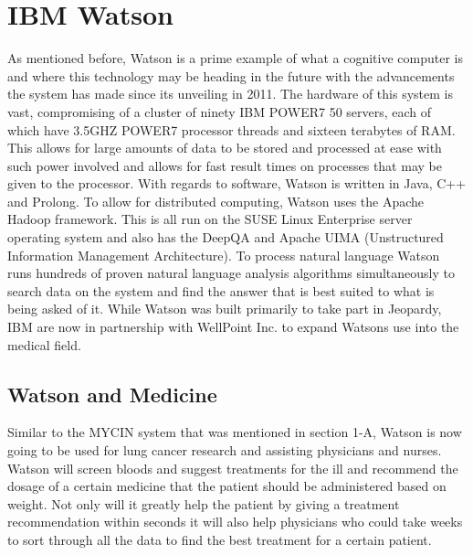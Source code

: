 \documentclass[journal]{IEEEtran}
\begin{document}
\section{IBM Watson}
As mentioned before, Watson is a prime example of what a cognitive computer is and where this technology may be heading in the future with the advancements the system has made since its unveiling in 2011. The hardware of this system is vast, compromising of a cluster of ninety IBM POWER7 50 servers, each of which have 3.5GHZ POWER7 processor threads and sixteen terabytes of RAM\cite{power}. This allows for large amounts of data to be stored and processed at ease with such power involved and allows for fast result times on processes that may be given to the processor. With regards to software, Watson is written in Java, C++ and Prolong. To allow for distributed computing, Watson uses the Apache Hadoop framework\cite{hadoop}. This is all run on the SUSE Linux Enterprise server operating system and also has the DeepQA and Apache UIMA (Unstructured Information Management Architecture). To process natural language Watson runs hundreds of proven natural language analysis algorithms simultaneously to search data on the system and find the answer that is best suited to what is being asked of it. While Watson was built primarily to take part in Jeopardy, IBM are now in partnership with WellPoint Inc. to expand Watsons use into the medical field.

\subsection{Watson and Medicine}
Similar to the MYCIN system that was mentioned in section 1-A, Watson is now going to be used for lung cancer research and assisting physicians and nurses\cite{WellPointIBM}. Watson will screen bloods and suggest treatments for the ill and recommend the dosage of a certain medicine that the patient should be administered based on weight. Not only will it greatly help the patient by giving a treatment recommendation within seconds it will also help physicians who could take weeks to sort through all the data to find the best treatment for a certain patient.
\end{document}
